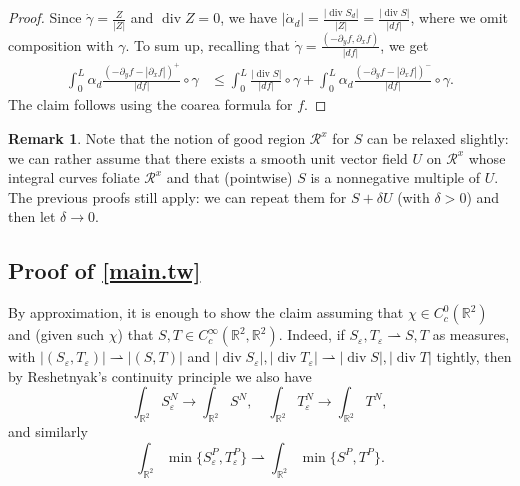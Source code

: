 \documentclass[11pt,a4paper]{amsart}
\newcommand{\R}{\mathbb{R}}
\newcommand{\de}{\partial}
\theoremstyle{definition}
\newtheorem{rmk}[definition]{Remark}
\DeclareMathOperator{\dive}{div}
\renewcommand{\epsilon}{\varepsilon}
\newcommand{\weakto}{\rightharpoonup}
\begin{document}
\begin{proof}
	Since $\dot\gamma=\frac{Z}{|Z|}$ and $\dive Z=0$, we have $|\dot\alpha_d|=\frac{\lvert \dive S_d\rvert}{|Z|}=\frac{\lvert \dive S\rvert}{|df|}$, where we omit composition with $\gamma$. To sum up, recalling that $\dot\gamma=\frac{(-\de_y f,\de_x f)}{|df|}$, we get
	\begin{align*}
		\int_0^L\alpha_d\frac{(-\de_y f-|\de_x f|)^+}{|df|}\circ\gamma
		&\le\int_0^L\frac{\lvert \dive S\rvert}{|df|}\circ\gamma
		+\int_0^L\alpha_d\frac{(-\de_y f-|\de_x f|)^-}{|df|}\circ\gamma.
	\end{align*}
	The claim follows using the coarea formula for $f$.
\end{proof}

\begin{rmk}\label{also.vanish}
Note that the notion of good region $\mathcal{R}^x$ for $S$ can be relaxed slightly:
we can rather assume that there exists a smooth unit vector field $U$ on $\mathcal{R}^x$
whose integral curves foliate $\mathcal{R}^x$ and that (pointwise) $S$ is a nonnegative multiple of $U$.
The previous proofs still apply: we can repeat them for $S+\delta U$ (with $\delta>0$) and then let $\delta\to0$.
\end{rmk}



\subsection{Proof of \cref{main.tw}}
%
By approximation, it is enough to show the claim assuming
that $\chi\in C^0_c(\R^2)$ and (given such $\chi$) that $S,T\in C^\infty_c(\R^2,\R^2)$.
Indeed, if $S_\epsilon,T_\epsilon\weakto S,T$ as measures, with $|(S_\epsilon,T_\epsilon)|\weakto|(S,T)|$
and $\lvert\dive S_\epsilon\rvert,\lvert\dive T_\epsilon\rvert\weakto\lvert\dive S\rvert,\lvert\dive T\rvert$
tightly,
then by Reshetnyak's continuity principle we also have
$$\int_{\R^2}S_\epsilon^N\to\int_{\R^2}S^N,\quad\int_{\R^2}T_\epsilon^N\to\int_{\R^2}T^N,$$
and similarly
$$\int_{\R^2}\min\{S_\epsilon^P,T_\epsilon^P\}
\weakto\int_{\R^2}\min\{S^P,T^P\}.$$
\end{document}

